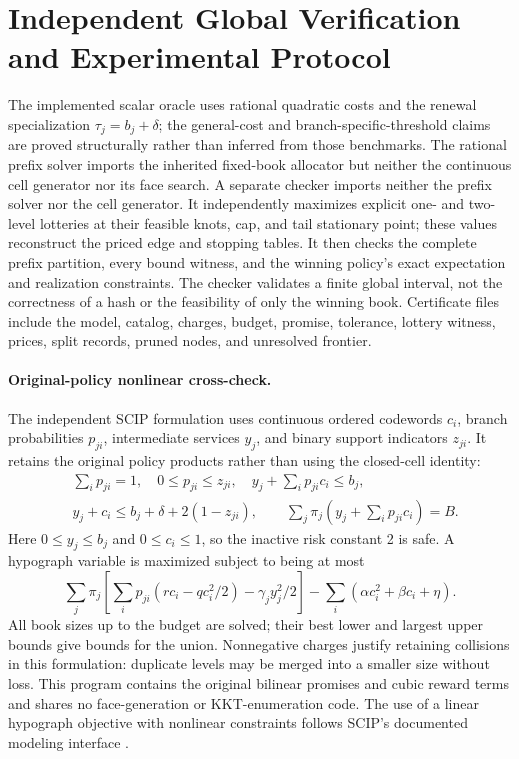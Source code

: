 \section{Independent Global Verification and Experimental Protocol}\label{sec:r43-implementation}
The implemented scalar oracle uses rational quadratic costs and the renewal specialization $\tau_j=b_j+\delta$; the general-cost and branch-specific-threshold claims are proved structurally rather than inferred from those benchmarks. The rational prefix solver imports the inherited fixed-book allocator but neither the continuous cell generator nor its face search. A separate checker imports neither the prefix solver nor the cell generator. It independently maximizes explicit one- and two-level lotteries at their feasible knots, cap, and tail stationary point; these values reconstruct the priced edge and stopping tables. It then checks the complete prefix partition, every bound witness, and the winning policy's exact expectation and realization constraints. The checker validates a finite global interval, not the correctness of a hash or the feasibility of only the winning book. Certificate files include the model, catalog, charges, budget, promise, tolerance, lottery witness, prices, split records, pruned nodes, and unresolved frontier.

\paragraph{Original-policy nonlinear cross-check.}
The independent SCIP formulation uses continuous ordered codewords $c_i$, branch probabilities $p_{ji}$, intermediate services $y_j$, and binary support indicators $z_{ji}$. It retains the original policy products rather than using the closed-cell identity:
\begin{align*}
 &\sum_i p_{ji}=1,\quad 0\leq p_{ji}\leq z_{ji},\quad
 y_j+\sum_i p_{ji}c_i\leq b_j,\\
 &y_j+c_i\leq b_j+\delta+2(1-z_{ji}),\qquad
 \sum_j\pi_j\left(y_j+\sum_i p_{ji}c_i\right)=B.
\end{align*}
Here $0\leq y_j\leq b_j$ and $0\leq c_i\leq1$, so the inactive risk constant 2 is safe. A hypograph variable is maximized subject to being at most
\[
 \sum_j\pi_j\left[\sum_i p_{ji}(rc_i-qc_i^2/2)-\gamma_jy_j^2/2\right]
 -\sum_i(\alpha c_i^2+\beta c_i+\eta).
\]
All book sizes up to the budget are solved; their best lower and largest upper bounds give bounds for the union. Nonnegative charges justify retaining collisions in this formulation: duplicate levels may be merged into a smaller size without loss. This program contains the original bilinear promises and cubic reward terms and shares no face-generation or KKT-enumeration code. The use of a linear hypograph objective with nonlinear constraints follows SCIP's documented modeling interface \citep{ZIB2026}.

